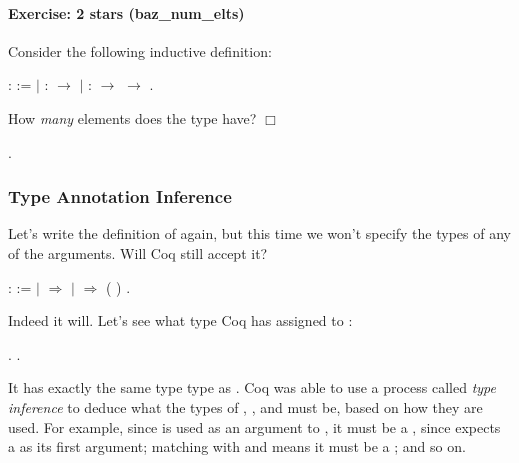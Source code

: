 \documentclass[12pt]{report}
\begin{document}
\paragraph{Exercise: 2 stars (baz\_num\_elts)}

 Consider the following inductive definition: \begin{coqdoccode}
\coqdocemptyline
\coqdocnoindent
{}  :  :=\coqdoceol
\coqdocindent{1.50em}
\ensuremath{|}  :  \ensuremath{\rightarrow} \coqdoceol
\coqdocindent{1.50em}
\ensuremath{|}  :  \ensuremath{\rightarrow}  \ensuremath{\rightarrow} .\coqdoceol
\coqdocemptyline
\end{coqdoccode}
How \textit{many} elements does the type  have? 
 \ensuremath{\Box} \begin{coqdoccode}
\coqdocemptyline
\coqdocnoindent
{} .\coqdoceol
\coqdocemptyline
\end{coqdoccode}
\subsubsection{Type Annotation Inference}



 Let's write the definition of  again, but this time we won't
    specify the types of any of the arguments. Will Coq still accept
    it? \begin{coqdoccode}
\coqdocemptyline
\coqdocnoindent
{}     :   :=\coqdoceol
\coqdocindent{1.00em}
  \coqdoceol
\coqdocindent{1.00em}
\ensuremath{|}       \ensuremath{\Rightarrow} \coqdoceol
\coqdocindent{1.00em}
\ensuremath{|}    \ensuremath{\Rightarrow}    (   )\coqdoceol
\coqdocindent{1.00em}
.\coqdoceol
\coqdocemptyline
\end{coqdoccode}
Indeed it will.  Let's see what type Coq has assigned to : \begin{coqdoccode}
\coqdocemptyline
\coqdocnoindent
{} .\coqdoceol
\coqdocnoindent
{} .\coqdoceol
\coqdocemptyline
\end{coqdoccode}
It has exactly the same type type as .  Coq was able to
    use a process called \textit{type inference} to deduce what the types of
    , , and  must be, based on how they are used.  For
    example, since  is used as an argument to , it must be a
    , since  expects a  as its first argument;
    matching  with  and  means it must be a ; and
    so on.
\end{document}
